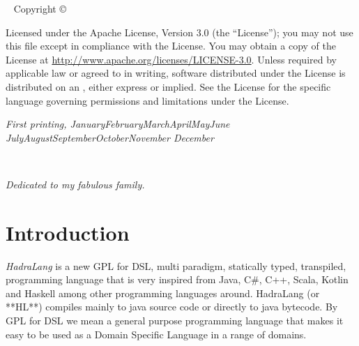 \documentclass{tufte-book}
\newcommand{\monthyear}{%
	\ifcase\month\or January\or February\or March\or April\or May\or June\or
	July\or August\or September\or October\or November\or
	December\fi\space\number\year
}
\begin{document}
    
    \newpage
    \begin{fullwidth}
        ~\vfill
        \thispagestyle{empty}
        \setlength{\parindent}{0pt}
        \setlength{\parskip}{\baselineskip}
        Copyright \copyright\ \the\year\ \thanklessauthor
        
        \par{}
        
        \par{}
        
        \par Licensed under the Apache License, Version 3.0 (the ``License''); you may not
        use this file except in compliance with the License. You may obtain a copy
        of the License at \url{http://www.apache.org/licenses/LICENSE-3.0}. Unless
        required by applicable law or agreed to in writing, software distributed
        under the License is distributed on an , either express or implied. See the
        License for the specific language governing permissions and limitations
        under the License.
        
        \par\textit{First printing, \monthyear}
    \end{fullwidth}

    \tableofcontents

    \listoffigures

    \listoftables

    \cleardoublepage
    ~\vfill
    \begin{doublespace}
        \noindent\fontsize{18}{22}\selectfont\itshape
        \nohyphenation
        Dedicated to my fabulous family.
    \end{doublespace}
    \vfill
    \vfill


    \cleardoublepage
    \chapter*{Introduction}

        \textit{HadraLang} is a new GPL for DSL, multi paradigm, statically typed, transpiled, programming language that is very inspired from Java, C\#, C++, Scala, Kotlin and Haskell among other programming languages around. HadraLang (or **HL**) compiles mainly to java source code or directly to java bytecode. By GPL for DSL we mean a general purpose programming language that makes it easy to be used as a Domain Specific Language in a range of domains. 
        
\end{document}
